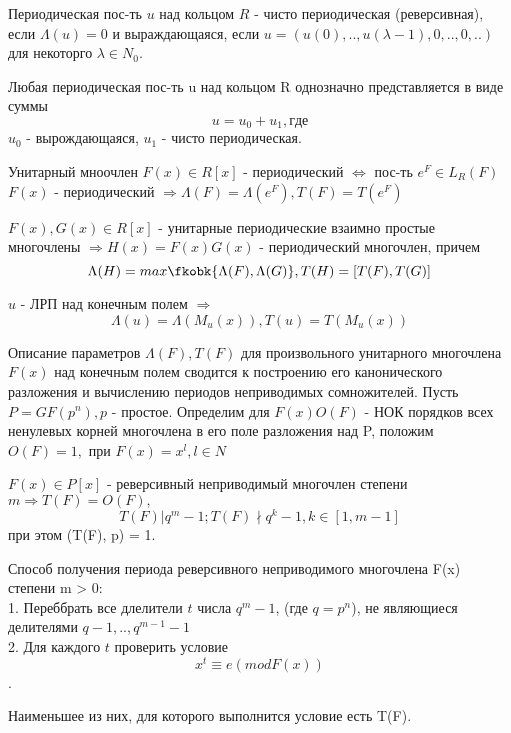 \begin{defs}
Периодическая пос-ть $u$ над кольцом $R$ - чисто периодическая (реверсивная), если $\Lambda(u) = 0$ и выраждающаяся, если $u = (u(0),..,u(\lambda-1), 0,..,0,..)$ для некоторго $\lambda \in N_0$.
\end{defs} 

\begin{proofs}
Любая периодическая пос-ть u над кольцом R однозначно представляется в виде суммы 
$$u = u_0 + u_1, где$$
$u_0$ - вырождающаяся, $u_1$ - чисто периодическая.
\end{proofs}

\begin{proofs}
Унитарный мноочлен $F(x) \in R[x]$ - периодический $\Leftrightarrow$ пос-ть $e^F \in L_R(F)$
\\$F(x)$ - периодический $\Rightarrow \Lambda(F) = \Lambda(e^F),  T(F) = T(e^F)$ 
\end{proofs}

\begin{proofs}
$F(x), G(x) \in R[x]$ - унитарные периодические взаимно простые многочлены $\Rightarrow H(x) = F(x)G(x)$ - периодический многочлен, причем
$$\Lambda(H) = max \fkobk{\Lambda(F), \Lambda(G)}, T(H) = [T(F), T(G)]$$
\end{proofs}

\begin{proofs}
$u$ - ЛРП над конечным полем $\Rightarrow$
$$\Lambda(u) = \Lambda(M_u(x)), T(u) = T(M_u(x))$$
\end{proofs}

\begin{defs}
Описание параметров $\Lambda(F), T(F)$ для произвольного унитарного многочлена $F(x)$ над конечным полем сводится к построению его канонического разложения и вычислению периодов неприводимых сомножителей. Пусть $P = GF(p^n), p$ - простое. Определим для $F(x) O(F)$ - НОК порядков всех ненулевых корней многочлена в его поле разложения над P, положим $O(F) = 1,$ при $F(x) = x^l, l \in N$ 
\end{defs}

\begin{proofs}
$F(x) \in P[x]$ - реверсивный неприводимый многочлен степени $m \Rightarrow T(F) = O(F),$
$$T(F) | q^m - 1; T(F) \nmid q^k - 1, k \in [1, m-1]$$ 
при этом (T(F), p) = 1.
\end{proofs}

\begin{defs}
Способ получения периода реверсивного неприводимого многочлена F(x) степени m > 0:
\\1. Переббрать все длелители $t$ числа $q^m - 1$, (где $q = p^n$), не являющиеся делителями $q-1,.., q^{m-1} - 1$ 
\\2. Для каждого $t$ проверить условие 
$$x^t \equiv e (mod F(x))$$.

Наименьшее из них, для которого выполнится условие есть T(F). 
\end{defs}


